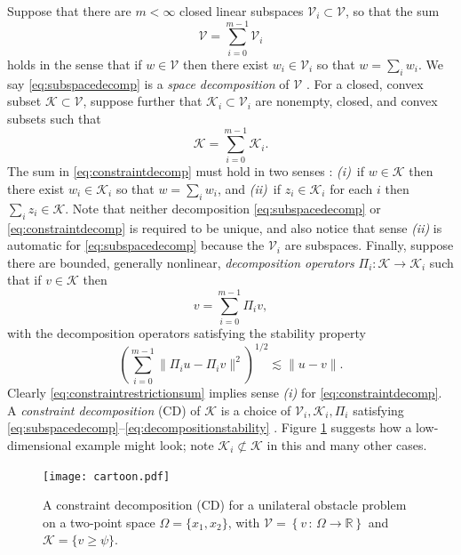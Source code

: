 \documentclass[review,hidelinks,onefignum,onetabnum,final]{siamart220329}  %
\newcommand{\RR}{\mathbb{R}}
\newcommand{\cK}{\mathcal{K}}
\newcommand{\cV}{\mathcal{V}}
\begin{document}
Suppose that there are $m<\infty$ closed linear subspaces $\cV_i \subset \cV$, so that the sum
\begin{equation}
\cV = \sum_{i=0}^{m-1} \cV_i \label{eq:subspacedecomp}
\end{equation}
holds in the sense that if $w \in \cV$ then there exist $w_i \in \cV_i$ so that $w = \sum_i w_i$.  We say \eqref{eq:subspacedecomp} is a \emph{space decomposition} of $\cV$ \cite{Xu1992}.  For a closed, convex subset $\cK \subset \cV$, suppose further that $\cK_i \subset \cV_i$ are nonempty, closed, and convex subsets such that
\begin{equation}
\cK = \sum_{i=0}^{m-1} \cK_i. \label{eq:constraintdecomp}
\end{equation}
The sum in \eqref{eq:constraintdecomp} must hold in two senses \cite{TaiTseng2002}: \emph{(i)}~if $w \in \cK$ then there exist $w_i \in \cK_i$ so that $w = \sum_i w_i$, and \emph{(ii)}~if $z_i \in \cK_i$ for each $i$ then $\sum_i z_i \in \cK$.  Note that neither decomposition \eqref{eq:subspacedecomp} or \eqref{eq:constraintdecomp} is required to be unique, and also notice that sense \emph{(ii)} is automatic for \eqref{eq:subspacedecomp} because the $\cV_i$ are subspaces.  Finally, suppose there are bounded, generally nonlinear, \emph{decomposition operators} $\Pi_i : \cK \to \cK_i$ such that if $v \in \cK$ then
\begin{equation}
v = \sum_{i=0}^{m-1} \Pi_i v,  \label{eq:constraintrestrictionsum}
\end{equation}
with the decomposition operators satisfying the stability property
\begin{equation} \label{eq:decompositionstability}
\left(\sum_{i=0}^{m-1} \| \Pi_i u - \Pi_i v \|^2\right)^{1/2} \lesssim \|u - v\|.
\end{equation}
Clearly \eqref{eq:constraintrestrictionsum} implies sense \emph{(i)} for \eqref{eq:constraintdecomp}.  A \emph{constraint decomposition} (CD) of $\cK$ is a choice of $\cV_i,\cK_i,\Pi_i$ satisfying \eqref{eq:subspacedecomp}--\eqref{eq:decompositionstability} \cite{Tai2003}.  Figure \ref{fig:cartoon} suggests how a low-dimensional example might look; note $\cK_i \not\subset \cK$ in this and many other cases.

\begin{figure}[ht]
\centering
\texttt{[image: cartoon.pdf]}
\caption{A constraint decomposition (CD) for a unilateral obstacle problem on a two-point space $\Omega=\{x_1,x_2\}$, with $\mathcal{V}=\left\{v \,:\, \Omega \to \RR\right\}$ and $\mathcal{K}=\{v\ge \psi\}$.}
\label{fig:cartoon}
\end{figure}
\end{document}

